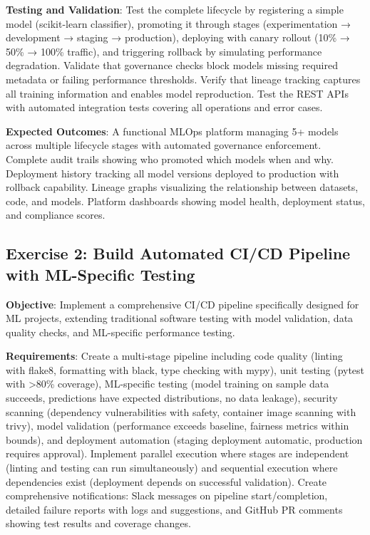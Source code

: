 \textbf{Testing and Validation}: Test the complete lifecycle by registering a simple model (scikit-learn classifier), promoting it through stages (experimentation → development → staging → production), deploying with canary rollout (10\% → 50\% → 100\% traffic), and triggering rollback by simulating performance degradation. Validate that governance checks block models missing required metadata or failing performance thresholds. Verify that lineage tracking captures all training information and enables model reproduction. Test the REST APIs with automated integration tests covering all operations and error cases.

\textbf{Expected Outcomes}: A functional MLOps platform managing 5+ models across multiple lifecycle stages with automated governance enforcement. Complete audit trails showing who promoted which models when and why. Deployment history tracking all model versions deployed to production with rollback capability. Lineage graphs visualizing the relationship between datasets, code, and models. Platform dashboards showing model health, deployment status, and compliance scores.

\subsection{Exercise 2: Build Automated CI/CD Pipeline with ML-Specific Testing}

\textbf{Objective}: Implement a comprehensive CI/CD pipeline specifically designed for ML projects, extending traditional software testing with model validation, data quality checks, and ML-specific performance testing.

\textbf{Requirements}: Create a multi-stage pipeline including code quality (linting with flake8, formatting with black, type checking with mypy), unit testing (pytest with >80\% coverage), ML-specific testing (model training on sample data succeeds, predictions have expected distributions, no data leakage), security scanning (dependency vulnerabilities with safety, container image scanning with trivy), model validation (performance exceeds baseline, fairness metrics within bounds), and deployment automation (staging deployment automatic, production requires approval). Implement parallel execution where stages are independent (linting and testing can run simultaneously) and sequential execution where dependencies exist (deployment depends on successful validation). Create comprehensive notifications: Slack messages on pipeline start/completion, detailed failure reports with logs and suggestions, and GitHub PR comments showing test results and coverage changes.

